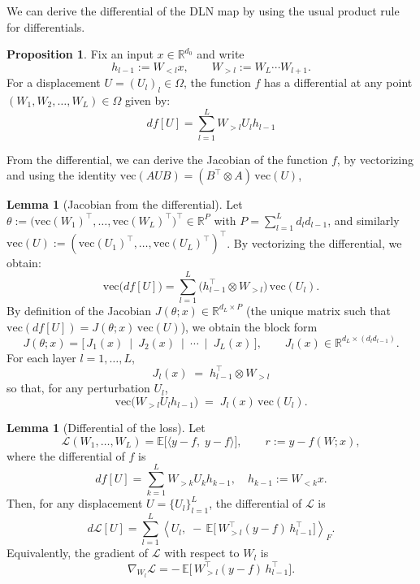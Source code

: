 \documentclass{article}
\theoremstyle{definition}
\newtheorem{proposition}[theorem]{Proposition}
\newtheorem{lemma}[theorem]{Lemma}
\begin{document}
We can derive the differential of the DLN map by using the usual product rule for differentials.
\begin{proposition}
    Fix an input $x\in\mathbb{R}^{d_0}$ and write
\[
h_{l-1}:=W_{<l}x,\qquad W_{>l}:=W_L\cdots W_{l+1}.
\]
    For a displacement $U=(U_l)_l\in\Omega$, the function $f$ has a differential at any point $(W_1, W_2, \ldots, W_L) \in \Omega$ given by:
    \begin{equation*}
        df[U] = \sum_{l=1}^L W_{>l} U_l h_{l-1}
    \end{equation*}
\end{proposition}
From the differential, we can derive the Jacobian of the function $f$, by vectorizing and using the identity $\mathrm{vec}(AUB)=(B^\top\!\otimes A)\,\mathrm{vec}(U)$,
\begin{lemma}[Jacobian from the differential] 
Let $\theta:=\big(\mathrm{vec}(W_1)^\top,\dots,\mathrm{vec}(W_L)^\top\big)^\top\in\mathbb{R}^{P}$ with
$P=\sum_{l=1}^L d_l d_{l-1}$, and similarly $\mathrm{vec}(U):=(\mathrm{vec}(U_1)^\top,\dots,\mathrm{vec}(U_L)^\top)^\top$. By vectorizing the differential, we obtain:
\[
\mathrm{vec}\!\big(df[U]\big)
= \sum_{l=1}^L \big(h_{l-1}^\top\!\otimes W_{>l}\big)\,\mathrm{vec}(U_l).
\]
By definition of the Jacobian $J(\theta;x)\in\mathbb{R}^{d_L\times P}$ (the unique matrix such that
$\mathrm{vec}(df[U])=J(\theta;x)\,\mathrm{vec}(U)$), we obtain the block form
\[
\,J(\theta;x)=\big[\,J_1(x)\ \mid\ J_2(x)\ \mid\ \cdots\ \mid\ J_L(x)\,\big],\qquad
J_l(x)\in\mathbb{R}^{d_L\times (d_l d_{l-1})}. \,
\]
For each layer $l=1,\dots,L$,
\[
\boxed{\; J_l(x) \;=\; h_{l-1}^\top \otimes W_{>l} \;}
\]
so that, for any perturbation $U_l$,
\[
\mathrm{vec}\!\big(W_{>l}U_l h_{l-1}\big) \;=\; J_l(x)\,\mathrm{vec}(U_l).
\]
\end{lemma}
\begin{lemma}[Differential of the loss]
Let 
\[
\mathcal{L}(W_1,\ldots,W_L)
= \mathbb{E}\big[\langle y-f,\;y-f\rangle\big],
\qquad
r := y - f(W;x),
\]
where the differential of $f$ is
\[
df[U] = \sum_{k=1}^L W_{>k} U_k h_{k-1},
\quad
h_{k-1} := W_{<k}x.
\]
Then, for any displacement $U=\{U_l\}_{l=1}^L$, the differential of $\mathcal{L}$ is
\[
\boxed{
d\mathcal{L}[U]
= \sum_{l=1}^L
\left\langle U_l,\;
-\,\mathbb{E}\!\big[\,W_{>l}^{\top}(y-f)\,h_{l-1}^{\top}\big]
\right\rangle_F.
}
\]
Equivalently, the gradient of $\mathcal{L}$ with respect to $W_l$ is
\[
\boxed{
\nabla_{W_l}\mathcal{L}
= -\,\mathbb{E}\!\big[\,W_{>l}^{\top}(y-f)\,h_{l-1}^{\top}\big].
}
\]
\end{lemma}
\end{document}
